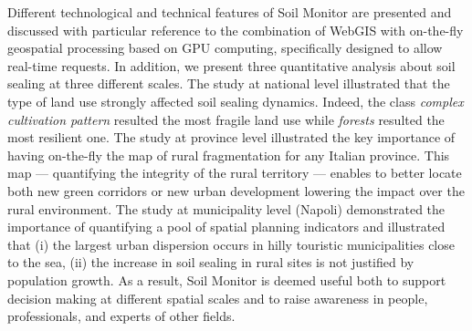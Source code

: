 \documentclass[APA,LATO1COL,doublespace]{WileyNJD-v2}
\begin{document}
{Different technological and technical features of Soil Monitor are presented and discussed with particular reference to the combination of WebGIS with on-the-fly geospatial processing based on GPU computing, specifically designed to allow real-time requests.
In addition, we present three quantitative analysis about soil sealing at three different scales.
The study at national level illustrated that the type of land use strongly affected soil sealing dynamics.
Indeed, the class \textit{complex cultivation pattern} resulted the most fragile land use while \textit{forests} resulted the most resilient one.
The study at province level illustrated the key importance of having on-the-fly the map of rural fragmentation for any Italian province.
This map --- quantifying the integrity of the rural territory --- enables to better locate both new green corridors or new urban development lowering the impact over the rural environment.
The study at municipality level (Napoli) demonstrated the importance of quantifying a pool of spatial planning indicators and illustrated that (i) the largest urban dispersion occurs in hilly touristic municipalities close to the sea, (ii) the increase in soil sealing in rural sites is not justified by population growth.
As a result, Soil Monitor is deemed useful both to support decision making at different spatial scales and to raise awareness in people, professionals, and experts of other fields.
}



\maketitle

\end{document}
